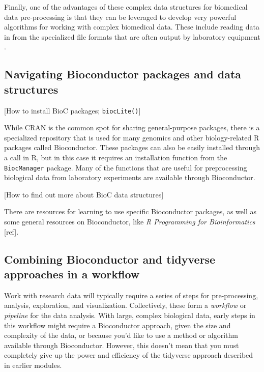 \documentclass[]{tufte-book}
\begin{document}
Finally, one of the advantages of these complex data structures for biomedical
data pre-processing is that they can be leveraged to develop very powerful
algorithms for working with complex biomedical data. These include reading data
in from the specialized file formats that are often output by laboratory
equipment \citep{holmes2018modern}.

\subsection{Navigating Bioconductor packages and data structures}\label{navigating-bioconductor-packages-and-data-structures}

{[}How to install BioC packages; \texttt{biocLite()}{]}

While CRAN is the common spot for sharing general-purpose packages, there is a
specialized repository that is used for many genomics and other biology-related
R packages called Bioconductor. These packages can also be easily installed
through a call in R, but in this case it requires an installation function from
the \texttt{BiocManager} package. Many of the functions that are useful for
preprocessing biological data from laboratory experiments are available through
Bioconductor.

{[}How to find out more about BioC data structures{]}

There are resources for learning to use specific Bioconductor packages, as well
as some general resources on Bioconductor, like \emph{R Programming for
Bioinformatics} {[}ref{]}.

\subsection{Combining Bioconductor and tidyverse approaches in a workflow}\label{combining-bioconductor-and-tidyverse-approaches-in-a-workflow}

Work with research data will typically require a series of steps for
pre-processing, analysis, exploration, and visualization. Collectively, these
form a \emph{workflow} or \emph{pipeline} for the data analysis. With large, complex
biological data, early steps in this workflow might require a Bioconductor
approach, given the size and complexity of the data, or because you'd like to
use a method or algorithm available through Bioconductor. However, this doesn't
mean that you must completely give up the power and efficiency of the tidyverse
approach described in earlier modules.
\end{document}
